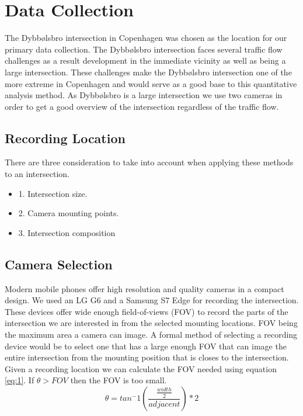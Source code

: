 \documentclass[
10pt, %
a4paper, %
oneside, %
headinclude,footinclude, %
] {book}%
\begin{document}
\section{Data Collection}

The Dybbølsbro intersection in Copenhagen was chosen as the location for our primary data collection. 
The Dybbølsbro intersection faces several traffic flow challenges as a result development in the immediate vicinity as well as being a large intersection.
These challenges make the Dybbølsbro intersection one of the more extreme in Copenhagen and would serve as a good base to this quantitative analysis method. 
As Dybbølsbro is a large intersection we use two cameras in order to get a good overview of the intersection regardless of the traffic flow.

\subsection{Recording Location}

There are three consideration to take into account when applying these methods to an intersection.
\begin{itemize}
	\item1. Intersection size.
	\item2. Camera mounting points.
	\item3. Intersection composition
\end{itemize}

\subsection{Camera Selection}

Modern mobile phones offer high resolution and quality cameras in a compact design. We used an LG G6 and a Samsung S7 Edge for recording the intersection.
These devices offer wide enough field-of-views (FOV) to record the parts of the intersection we are interested in from the selected mounting locations.
FOV being the maximum area a camera can image. A formal method of selecting a recording device would be to select one that has a large enough FOV that can image the entire intersection 
from the mounting position that is closes to the intersection. Given a recording location we can calculate the FOV needed using equation \ref{eq:1}.
If $\theta > FOV$ then the FOV is too small.
\begin{equation}
    \theta = tan^-1(\frac{\frac{width}{2}}{adjacent}) * 2\label{eq:1}
  \end{equation}
\end{document}
